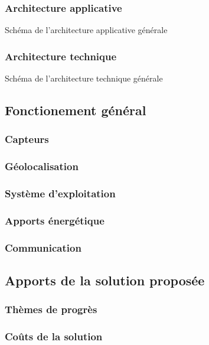 \documentclass{mise_en_page}
\begin{document}
\subsubsection{Architecture applicative}

Schéma de l'architecture applicative générale

\subsubsection{Architecture technique}

Schéma de l'architecture technique générale

\subsection{Fonctionement général}

\subsubsection{Capteurs}

\subsubsection{Géolocalisation}

\subsubsection{Système d'exploitation}

\subsubsection{Apports énergétique}

\subsubsection{Communication}

\subsection{Apports de la solution proposée}

\subsubsection{Thèmes de progrès}

\subsubsection{Coûts de la solution}
\end{document}
